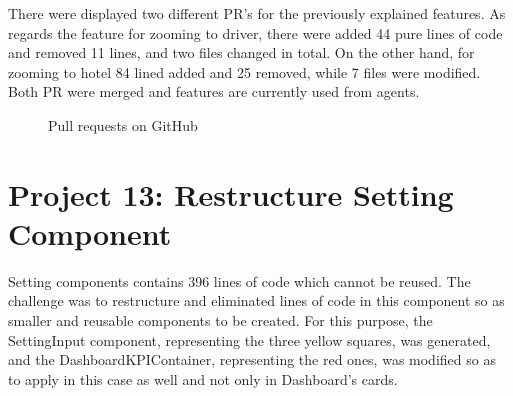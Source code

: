 There were displayed two different PR's for the previously explained features. As regards the feature for zooming to driver, there were added 44 pure lines of code and removed 11 lines, and two files changed in total. On the other hand, for zooming to hotel 84 lined added and 25 removed, while 7 files were modified. Both PR were merged and features are currently used from agents. \par

\begin{figure}[H]
	\centering
	\qquad
	\caption{
		Pull requests on GitHub
	}
\end{figure}


\section{Project 13: Restructure Setting Component}

Setting components contains 396 lines of code which cannot be reused. The challenge was to restructure and eliminated lines of code in this component so as smaller and reusable components to be created. For this purpose, the SettingInput component, representing the three yellow squares, was generated, and the DashboardKPIContainer, representing the red ones, was modified so as to apply in this case as well and not only in Dashboard's cards. \par

